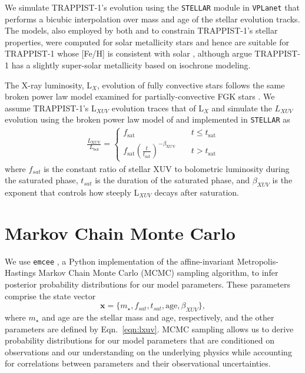 \documentclass[twocolumn]{aastex62}
\newcommand{\vplanet}[0]{\texttt{VPLanet}\xspace}
\newcommand{\stellar}[0]{\texttt{STELLAR}\xspace}
\begin{document}
We simulate TRAPPIST-1's evolution using the \stellar module in \vplanet \citep{Barnes2016,vplanet2018} that performs a bicubic interpolation over mass and age of the \citet{Baraffe2015} stellar evolution tracks. The \citet{Baraffe2015} models, also employed by both \citet{Burgasser2017} and \citet{vanGrootel2018} to constrain TRAPPIST-1's stellar properties, were computed for solar metallicity stars and hence are suitable for TRAPPIST-1 whose [Fe/H] is consistent with solar \citep{Gillon2016}, although \citet{Burgasser2017} argue TRAPPIST-1 has a slightly super-solar metallicity based on isochrone modeling.

The X-ray luminosity, L$_{X}$, evolution of fully convective stars follows the same broken power law model examined for partially-convective FGK stars \citep{Wright2016,Wright2018}. We assume TRAPPIST-1's L$_{XUV}$ evolution traces that of L$_{X}$ and simulate the $L_{XUV}$ evolution using the broken power law model of \citet{Pizzolato2003} and \citet{Ribas2005} implemented in \stellar as
\begin{align}
\label{eqn:lxuv}
\frac{L_\mathrm{XUV}}{L_\mathrm{bol}} = \left\{
				\begin{array}{lcr}
					f_\mathrm{sat} &\ & t \leq t_\mathrm{sat} \\
					f_\mathrm{sat}\left(\frac{t}{t_\mathrm{sat}}\right)^{-\beta_\mathrm{XUV}} &\ & t > t_\mathrm{sat}
				\end{array}
				\right.
\end{align}
where $f_{sat}$ is the constant ratio of stellar XUV to bolometric luminosity during the saturated phase, $t_{sat}$ is the duration of the saturated phase, and $\beta_{XUV}$ is the exponent that controls how steeply L$_{XUV}$ decays after saturation.


\section{Markov Chain Monte Carlo} \label{sec:mcmc}

We use \texttt{emcee} \citep{ForemanMackey2013}, a Python implementation of the \citet{Goodman2010} affine-invariant Metropolis-Hastings Markov Chain Monte Carlo (MCMC) sampling algorithm, to infer posterior probability distributions for our model parameters. These parameters comprise the state vector
\begin{equation}
    \textbf{x} = \{m_{\star}, f_{sat}, t_{sat}, \mathrm{age}, \beta_{XUV}\},
\end{equation}
where $m_{\star}$ and age are the stellar mass and age, respectively, and the other parameters are defined by Eqn.~\ref{eqn:lxuv}.  MCMC sampling allows us to derive probability distributions for our model parameters that are conditioned on observations and our understanding on the underlying physics while accounting for correlations between parameters and their observational uncertainties.  
\end{document}
